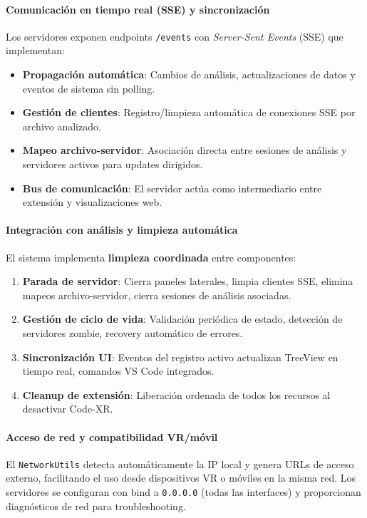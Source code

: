 \documentclass[a4paper, 12pt]{book}
\begin{document}
\paragraph{Comunicación en tiempo real (SSE) y sincronización}
Los servidores exponen endpoints \texttt{/events} con \emph{Server-Sent Events} (SSE) que implementan:

\begin{itemize}
  \item \textbf{Propagación automática}: Cambios de análisis, actualizaciones de datos y eventos de sistema sin polling.
  \item \textbf{Gestión de clientes}: Registro/limpieza automática de conexiones SSE por archivo analizado.
  \item \textbf{Mapeo archivo-servidor}: Asociación directa entre sesiones de análisis y servidores activos para updates dirigidos.
  \item \textbf{Bus de comunicación}: El servidor actúa como intermediario entre extensión y visualizaciones web.
\end{itemize}

\paragraph{Integración con análisis y limpieza automática}
El sistema implementa \textbf{limpieza coordinada} entre componentes:

\begin{enumerate}
  \item \textbf{Parada de servidor}: Cierra paneles laterales, limpia clientes SSE, elimina mapeos archivo-servidor, cierra sesiones de análisis asociadas.
  \item \textbf{Gestión de ciclo de vida}: Validación periódica de estado, detección de servidores zombie, recovery automático de errores.
  \item \textbf{Sincronización UI}: Eventos del registro activo actualizan TreeView en tiempo real, comandos VS Code integrados.
  \item \textbf{Cleanup de extensión}: Liberación ordenada de todos los recursos al desactivar Code-XR.
\end{enumerate}

\paragraph{Acceso de red y compatibilidad VR/móvil}
El \texttt{NetworkUtils} detecta automáticamente la IP local y genera URLs de acceso externo, facilitando el uso desde dispositivos VR o móviles en la misma red. Los servidores se configuran con bind a \texttt{0.0.0.0} (todas las interfaces) y proporcionan diagnósticos de red para troubleshooting.
\end{document}

